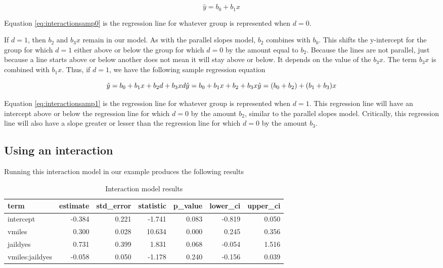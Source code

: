 \documentclass[
]{book}
\begin{document}
\begin{equation}
\hat{y} = b_0 + b_1x
\label{eq:interactionsamp0}
\end{equation}

Equation \eqref{eq:interactionsamp0} is the regression line for whatever group is represented when \(d=0\).

If \(d=1\), then \(b_2\) and \(b_3x\) remain in our model. As with the parallel slopes model, \(b_2\) combines with \(b_0\). This shifts the y-intercept for the group for which \(d=1\) either above or below the group for which \(d=0\) by the amount equal to \(b_2\). Because the lines are not parallel, just because a line starts above or below another does not mean it will stay above or below. It depends on the value of the \(b_3x\). The term \(b_3x\) is combined with \(b_1x\). Thus, if \(d=1\), we have the following sample regression equation

\begin{equation}
\hat{y} = b_0 + b_1x + b_2d + b_3xd\\
\hat{y} = b_0 + b_1x + b_2 + b_3x\\
\hat{y} = (b_0 + b_2) + (b_1 + b_3)x
\label{eq:interactionsamp1}
\end{equation}

Equation \eqref{eq:interactionsamp1} is the regression line for whatever group is represented when \(d=1\). This regression line will have an intercept above or below the regression line for which \(d=0\) by the amount \(b_2\), similar to the parallel slopes model. Critically, this regression line will also have a slope greater or lesser than the regression line for which \(d=0\) by the amount \(b_3\).

\hypertarget{using-an-interaction}{%
\subsection{Using an interaction}\label{using-an-interaction}}

Running this interaction model in our example produces the following results

\begin{table}

\caption{\label{tab:interactionmod}Interaction model results}
\centering
\begin{tabular}[t]{l|r|r|r|r|r|r}
\hline
term & estimate & std\_error & statistic & p\_value & lower\_ci & upper\_ci\\
\hline
intercept & -0.384 & 0.221 & -1.741 & 0.083 & -0.819 & 0.050\\
\hline
vmiles & 0.300 & 0.028 & 10.634 & 0.000 & 0.245 & 0.356\\
\hline
jaildyes & 0.731 & 0.399 & 1.831 & 0.068 & -0.054 & 1.516\\
\hline
vmiles:jaildyes & -0.058 & 0.050 & -1.178 & 0.240 & -0.156 & 0.039\\
\hline
\end{tabular}
\end{table}
\end{document}
